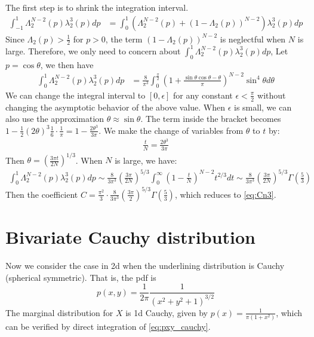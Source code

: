 \documentclass{article}
\begin{document}
The first step is to shrink the integration interval.
\begin{align*}
    \int_{-1}^{1} \Lambda_2^{N-2}(p)\lambda_2^3(p)dp
    &=\int_{0}^{1} \left(\Lambda_2^{N-2}(p)
    +(1-\Lambda_2(p))^{N-2}\right)\lambda_2^3(p)dp
\end{align*}
Since $\Lambda_2(p) > \frac{1}{2}$ for $p>0$, the term
$(1-\Lambda_2(p))^{N-2}$ is neglectful when
$N$ is large.
Therefore, we only need to concern about
$\int_{0}^{1} \Lambda_2^{N-2}(p)\lambda_2^3(p)dp$,
Let $p=\cos\theta$, we then have
\begin{align*}
    \int_{0}^{1} \Lambda_2^{N-2}(p)\lambda_2^3(p)dp
    &=\frac{8}{\pi^3}\int_{0}^{\frac{\pi}{2}}
    \left(1+\frac{\sin\theta\cos\theta - \theta}{\pi}\right)^{N-2}
    \sin^4 \theta d\theta
\end{align*}
We can change the integral interval to $[0, \epsilon]$
for any constant $\epsilon<\frac{\pi}{2}$ without changing
the asymptotic behavior of the above value.
When $\epsilon$ is small, we can also use the approximation
$\theta \approx \sin\theta$. The term inside
the bracket becomes $1-\frac{1}{2}(2\theta)^3\frac{1}{6}\cdot \frac{1}{\pi}
=1-\frac{2\theta^3}{3\pi}$. We make the change
of variables from $\theta$ to $t$ by:
\begin{align*}
    \frac{t}{N} = \frac{2\theta^3}{3\pi}
\end{align*}
Then $\theta = \left(\frac{3\pi t}{2N}\right)^{1/3}$.
When $N$ is large, we have:
\begin{align*}
\int_{0}^{1} \Lambda_2^{N-2}(p)\lambda_2^3(p)dp
\sim \frac{8}{3\pi^3} \left(\frac{3\pi}{2N}\right)^{5/3}\int_0^{\infty}
\left(1-\frac{t}{N}\right)^{N-2}t^{2/3}dt
\sim\frac{8}{3\pi^3} \left(\frac{3\pi}{2N}\right)^{5/3}
\Gamma\left(\frac{5}{3}\right)
\end{align*}
Then the coefficient $C=\frac{\pi^2}{3}\cdot\frac{8}{3\pi^3} \left(\frac{3\pi}{2}\right)^{5/3}
\Gamma\left(\frac{5}{3}\right)$,
which reduces to \eqref{eq:Cn3}.

\section{Bivariate Cauchy distribution}
Now we consider the case in 2d when the underlining
distribution is Cauchy (spherical symmetric). That is, the pdf is
\begin{equation}\label{eq:pxy_cauchy}
    p(x,y) = \frac{1}{2\pi} \frac{1}{(x^2+y^2+1)^{3/2}}
\end{equation}
The marginal distribution for $X$ is 1d Cauchy,
given by $p(x)=\frac{1}{\pi(1+x^2)}$, which
can be verified by direct integration of
\eqref{eq:pxy_cauchy}.
\end{document}
